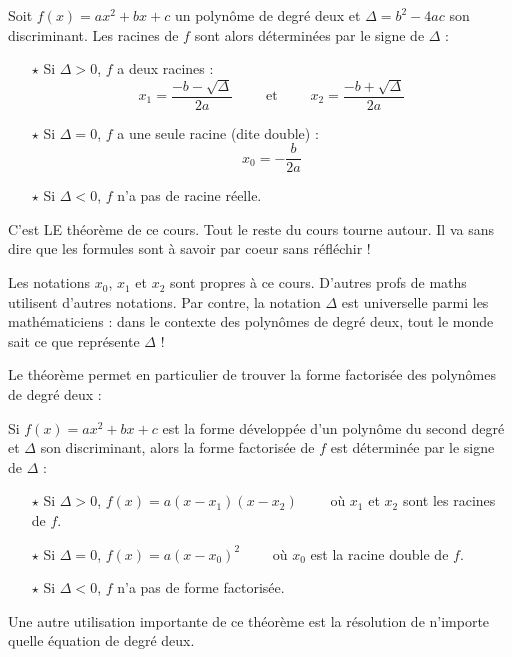 \documentclass[cours]{lycee-deveaux}
\begin{document}
\begin{theoreme}
  \label{theoreme-racines}
  Soit $f(x) = ax^2+bx+c$ un polynôme de degré deux et $\Delta=b^2-4ac$ son discriminant.
  Les racines de $f$ sont alors déterminées par le signe de $\Delta$ :
  \begin{enumerate}
    \item[$\star$]Si $\Delta > 0$, $f$ a deux racines :
      \[
      x_1 = \frac{-b-\sqrt{\Delta}}{2a} \qquad \text{ et } \qquad x_2 = \frac{-b+\sqrt{\Delta}}{2a}
      \]
    \item[$\star$]Si $\Delta = 0$, $f$ a une seule racine (dite double) :
      \[
      x_0 = -\frac{b}{2a}
      \]
      \item[$\star$]Si $\Delta < 0$, $f$ n'a pas de racine réelle.
  \end{enumerate}
\end{theoreme}

C'est LE théorème de ce cours. Tout le reste du cours tourne autour.
Il va sans dire que les formules sont à savoir par coeur sans réfléchir !

Les notations $x_0$, $x_1$ et $x_2$ sont propres à ce cours. D'autres profs de maths utilisent d'autres notations.
Par contre, la notation $\Delta$ est universelle parmi les mathématiciens : dans le contexte des polynômes de degré deux,
tout le monde sait ce que représente $\Delta$ !

\bigskip

Le théorème permet en particulier de trouver la forme factorisée des polynômes de degré deux :

\begin{propriete}
  \label{propriete-factorisation}
  Si $f(x)=ax^2+bx+c$ est la forme développée d'un polynôme du second degré et $\Delta$ son discriminant, alors
  la forme factorisée de $f$ est déterminée par le signe de $\Delta$ :
  \begin{enumerate}
  \item[$\star$]Si $\Delta > 0$, $f(x) = a(x-x_1)(x-x_2)\qquad$ où $x_1$ et $x_2$ sont les racines de $f$.
  \item[$\star$]Si $\Delta = 0$, $f(x) = a(x-x_0)^2\qquad$ où $x_0$ est la racine double de $f$.
  \item[$\star$]Si $\Delta < 0$, $f$ n'a pas de forme factorisée.
  \end{enumerate}
\end{propriete}

Une autre utilisation importante de ce théorème est la résolution de n'importe quelle équation de degré deux.
\end{document}
